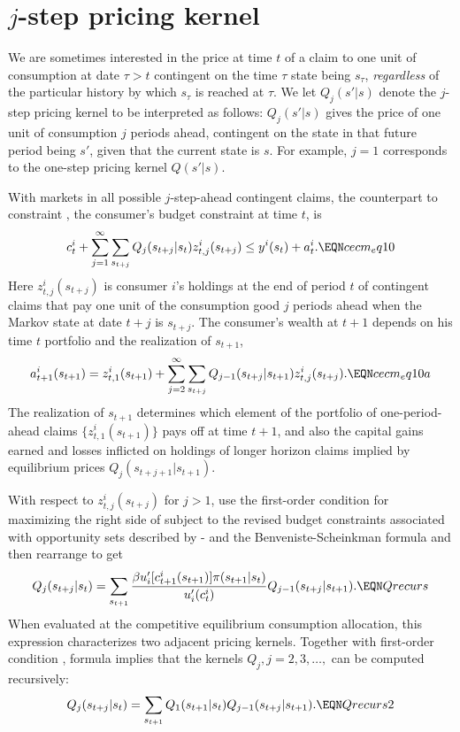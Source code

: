 \section{$j$-step pricing kernel}\label{sec:multi-step}%
We are sometimes interested in the price at time $t$ of a claim to
one unit of consumption at date $\tau >t $ contingent on the
time $\tau$ state being $s_\tau$, {\it regardless\/} of the
particular history by which $s_\tau$ is reached at $\tau$.  We let
$Q_j(s' | s)$ denote the $j$-step pricing kernel to be interpreted
as follows: $Q_j(s' | s)$ gives the price of one unit of
consumption $j$ periods ahead, contingent on the state in that
future period being $s'$, given that the current state is $s$. For
example, $j=1$ corresponds to the one-step pricing kernel $Q(s' |
s)$.


With markets in all possible $j$-step-ahead contingent claims,
the counterpart to constraint , the consumer's budget
constraint at time $t$, is
$$ c_t^i + \sum_{j=1}^\infty \sum_{ s_{t+j}} Q_j( s_{t+j} | s_t)
   z^i_{t,j}( s_{t+j}) \leq  y^i(s_t) + a_t^i. \EQN cecm_eq10   $$
Here $z^i_{t,j}( s_{t+j})$ is consumer $i$'s holdings at
the end of period $t$ of contingent claims that pay one unit of
the consumption good $j$ periods ahead when %
the Markov state at date $t+j$ is $ s_{t+j}$. The consumer's
wealth at $t+1$   depends on his time $t$  portfolio
and the realization of $s_{t+1}$,
$$
a^i_{t+1}(s_{t+1}) = z^i_{t,1}(s_{t+1})
   + \sum_{j=2}^\infty \sum_{ s_{t+j}}  Q_{j-1}( s_{t+j} | s_{t+1})
           z^i_{t,j}( s_{t+j}) . \EQN cecm_eq10a
$$
The realization of $s_{t+1}$ determines which element of the portfolio of
one-period-ahead claims $\{z^i_{t,1}( s_{t+1})\}$  pays off at
time $t+1$,
and also the capital gains earned and losses inflicted on  holdings of longer horizon
claims implied by equilibrium prices $Q_j( s_{t+j+1} | s_{t+1})$.


With respect to $z^i_{t,j}( s_{t+j})$ for $j>1$,
use the first-order condition for maximizing the right side of   subject to 
the revised budget constraints associated with opportunity sets described by
- 
and the Benveniste-Scheinkman formula and then rearrange to get
$$ Q_j( s_{t+j} | s_t ) = \sum_{s_{t+1}}
   {\beta u'_i[c^i_{t+1}(s_{t+1})] \pi(s_{t+1} | s_t) \over u'_i(c_t^i) }
   Q_{j-1}( s_{t+j} | s_{t+1} ).             \EQN Qrecurs $$
When evaluated at the competitive equilibrium
consumption allocation, this expression characterizes two adjacent pricing
kernels. Together with first-order
condition , formula   implies that the
kernels $Q_j, j = 2, 3, \ldots,$ can be computed recursively:
$$ Q_j( s_{t+j} | s_t) = \sum_{s_{t+1}} Q_1(s_{t+1} | s_t)
                      Q_{j-1}( s_{t+j} | s_{t+1}). \EQN Qrecurs2 $$




